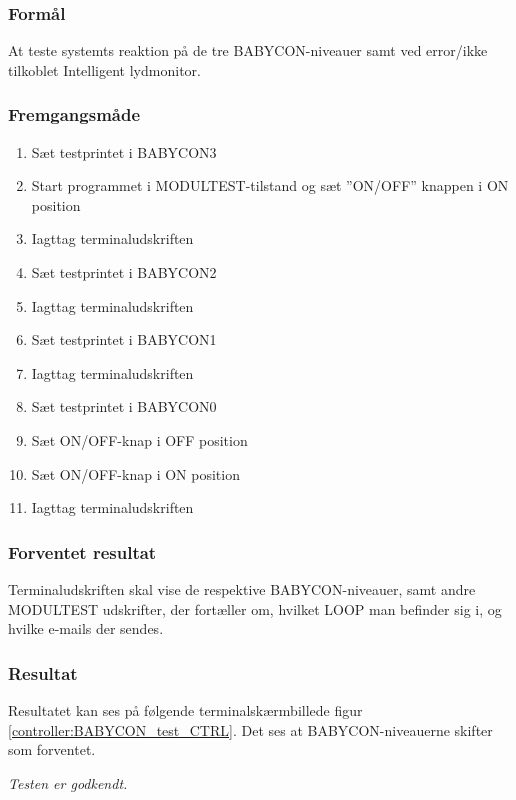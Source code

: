 \subsubsection*{Formål}
At teste systemts reaktion på de tre BABYCON-niveauer samt ved error/ikke tilkoblet Intelligent lydmonitor.

\subsubsection*{Fremgangsmåde}
\begin{enumerate}
\item Sæt testprintet i BABYCON3
\item Start programmet i MODULTEST-tilstand og sæt ''ON/OFF'' knappen i ON position
\item Iagttag terminaludskriften
\item Sæt testprintet i BABYCON2
\item Iagttag terminaludskriften
\item Sæt testprintet i BABYCON1
\item Iagttag terminaludskriften
\item Sæt testprintet i BABYCON0
\item Sæt ON/OFF-knap i OFF position
\item Sæt ON/OFF-knap i ON position
\item Iagttag terminaludskriften
\end{enumerate}

\subsubsection*{Forventet resultat} 
Terminaludskriften skal vise de respektive BABYCON-niveauer, samt andre MODULTEST udskrifter, der fortæller om, hvilket LOOP man befinder sig i, og hvilke e-mails der sendes.

\subsubsection*{Resultat} 
Resultatet kan ses på følgende terminalskærmbillede figur \ref{controller:BABYCON_test_CTRL}. Det ses at BABYCON-niveauerne skifter som forventet.


\textit{Testen er godkendt.}



